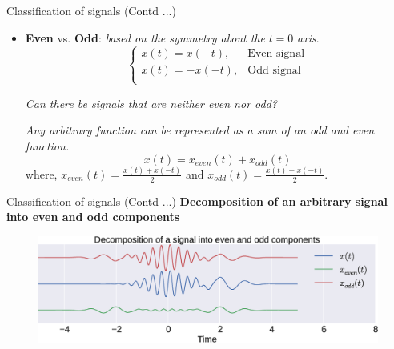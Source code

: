 \documentclass{beamer}
\begin{document}
\begin{frame}{Classification of signals (Contd ...)}
\begin{itemize}
\item \textbf{Even} vs. \textbf{Odd}: \textit{based on the symmetry about the} $t=0$ \textit{axis}.
\[\begin{cases}
x(t) = x(-t), & \text{Even signal} \\
x(t) = -x(-t), & \text{Odd signal} \\
\end{cases}\]

\textit{Can there be signals that are neither even nor odd?}

\begin{tcolorbox}[width=0.9\textwidth,colback={lightgray},title={\textbf{Theorem}},colbacktitle=black,coltitle=white]
\textit{Any arbitrary function can be represented as a sum of an odd and even function.}
\[ x(t) = x_{even}(t) + x_{odd}(t) \]
where, $ x_{even}(t) = \frac{x(t) + x(-t)}{2} $ and $ x_{odd}(t) = \frac{x(t) - x(-t)}{2} $.
\end{tcolorbox}
\end{itemize}
\end{frame}

\begin{frame}{Classification of signals (Contd ...)}
\textbf{Decomposition of an arbitrary signal into even and odd components}
\begin{figure}
\includegraphics[width=\textwidth]{img/even_odd.eps}
\end{figure}
\end{frame}
\end{document}
